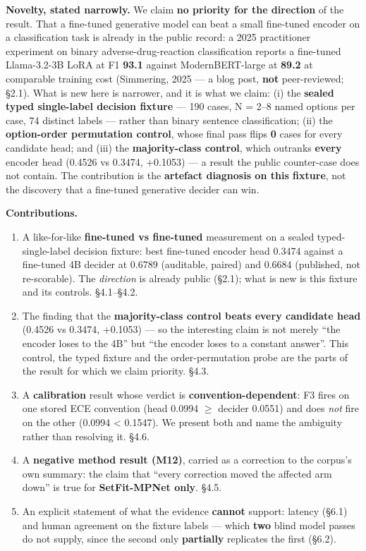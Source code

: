 \documentclass[10pt]{article}
\begin{document}
\textbf{Novelty, stated narrowly.} We claim \textbf{no priority for the direction} of the result. That a fine-tuned generative model can beat a small fine-tuned encoder on a classification task is already in the public record: a 2025 practitioner experiment on binary adverse-drug-reaction classification reports a fine-tuned Llama-3.2-3B LoRA at F1 \textbf{93.1} against ModernBERT-large at \textbf{89.2} at comparable training cost (Simmering, 2025 --- a blog post, \textbf{not} peer-reviewed; \S2.1). What is new here is narrower, and it is what we claim: (i) the \textbf{sealed typed single-label decision fixture} --- 190 cases, N = 2--8 named options per case, 74 distinct labels --- rather than binary sentence classification; (ii) the \textbf{option-order permutation control}, whose final pass flips \textbf{0} cases for every candidate head; and (iii) the \textbf{majority-class control}, which outranks \textbf{every} encoder head (0.4526 vs 0.3474, +0.1053) --- a result the public counter-case does not contain. The contribution is the \textbf{artefact diagnosis on this fixture}, not the discovery that a fine-tuned generative decider can win.

\textbf{Contributions.}

\begin{enumerate}
\item A like-for-like \textbf{fine-tuned vs fine-tuned} measurement on a sealed typed-single-label decision fixture: best fine-tuned encoder head 0.3474 against a fine-tuned 4B decider at 0.6789 (auditable, paired) and 0.6684 (published, not re-scorable). The \emph{direction} is already public (\S2.1); what is new is this fixture and its controls. \S4.1--\S4.2.
\item The finding that the \textbf{majority-class control beats every candidate head} (0.4526 vs 0.3474, +0.1053) --- so the interesting claim is not merely ``the encoder loses to the 4B'' but ``the encoder loses to a constant answer''. This control, the typed fixture and the order-permutation probe are the parts of the result for which we claim priority. \S4.3.
\item A \textbf{calibration} result whose verdict is \textbf{convention-dependent}: F3 fires on one stored ECE convention (head 0.0994 $\ge$ decider 0.0551) and does \emph{not} fire on the other (0.0994 < 0.1547). We present both and name the ambiguity rather than resolving it. \S4.6.
\item A \textbf{negative method result (M12)}, carried as a correction to the corpus's own summary: the claim that ``every correction moved the affected arm down'' is true for \textbf{SetFit-MPNet only}. \S4.5.
\item An explicit statement of what the evidence \textbf{cannot} support: latency (\S6.1) and human agreement on the fixture labels --- which \textbf{two} blind model passes do not supply, since the second only \textbf{partially} replicates the first (\S6.2).
\end{enumerate}
\end{document}
